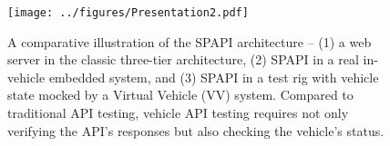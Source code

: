 \begin{figure}[t]
    \centering
    \texttt{[image: ../figures/Presentation2.pdf]}
    \caption{A comparative illustration of the SPAPI architecture -- (1) a web server in the classic three-tier architecture, (2) SPAPI in a real in-vehicle embedded system, and (3) SPAPI in a test rig with vehicle state mocked by a Virtual Vehicle (VV) system. Compared to traditional API testing, vehicle API testing requires not only verifying the API's responses but also checking the vehicle's status.}
    \label{fig:spapi-comparison}
\end{figure}
